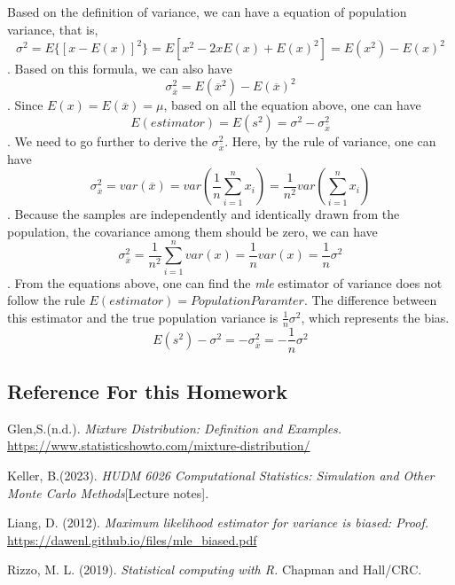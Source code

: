 \documentclass[
]{article}
\begin{document}
Based on the definition of variance, we can have a equation of
population variance, that is,
\[\sigma^2 = E\{[x - E(x)]^2\}=E[x^2-2xE(x)+E(x)^2]=E(x^2)-E(x)^2\].
Based on this formula, we can also have
\[\sigma_{\overline{x}}^2=E(\overline{x}^2)-E(\overline{x})^2\]. Since
\(E(x)=E(\overline{x})=\mu\), based on all the equation above, one can
have \[E(estimator)=E(s^2)= {\sigma}^2 - \sigma_{\overline{x}}^2\]. We
need to go further to derive the \(\sigma_{\overline{x}}^2\). Here, by
the rule of variance, one can have
\[\sigma_{\overline{x}}^2 = var(\overline{x})=var(\frac{1}{n}\sum_{i = 1}^{n}x_i)=\frac{1}{n^2}var(\sum_{i = 1}^{n}x_i)\].
Because the samples are independently and identically drawn from the
population, the covariance among them should be zero, we can have
\[\sigma_{\overline{x}}^2 =\frac{1}{n^2}\sum_{i = 1}^{n}var(x)=\frac{1}{n}var(x)=\frac{1}{n}{\sigma}^2\].
From the equations above, one can find the \emph{mle} estimator of
variance does not follow the rule
\(E(estimator) = Population Paramter\). The difference between this
estimator and the true population variance is \(\frac{1}{n}{\sigma}^2\),
which represents the bias.
\[E(s^2)-{\sigma}^2 = -\sigma_{\overline{x}}^2=-\frac{1}{n}{\sigma}^2\]

\hypertarget{reference-for-this-homework}{%
\subsection{Reference For this
Homework}\label{reference-for-this-homework}}

Glen,S.(n.d.). \emph{Mixture Distribution: Definition and Examples.}
\url{https://www.statisticshowto.com/mixture-distribution/}

Keller, B.(2023). \emph{HUDM 6026 Computational Statistics: Simulation
and Other Monte Carlo Methods}{[}Lecture notes{]}.

Liang, D. (2012). \emph{Maximum likelihood estimator for variance is
biased: Proof.} \url{https://dawenl.github.io/files/mle_biased.pdf}

Rizzo, M. L. (2019). \emph{Statistical computing with R.} Chapman and
Hall/CRC.
\end{document}
